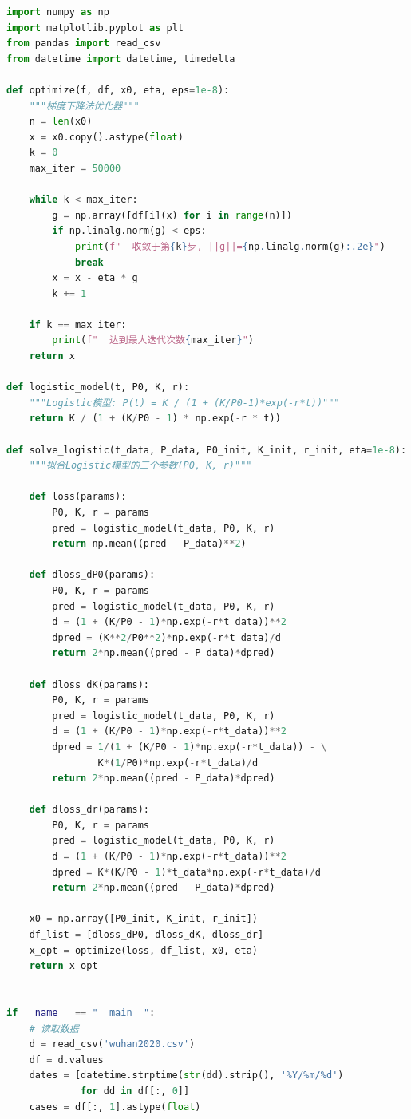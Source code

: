 \documentclass{article}
\begin{document}
\begin{lstlisting}[language=Python, caption={nonlinfitEx3.py —— COVID-19 Logistic模型}]
import numpy as np
import matplotlib.pyplot as plt
from pandas import read_csv
from datetime import datetime, timedelta

def optimize(f, df, x0, eta, eps=1e-8):
    """梯度下降法优化器"""
    n = len(x0)
    x = x0.copy().astype(float)
    k = 0
    max_iter = 50000
    
    while k < max_iter:
        g = np.array([df[i](x) for i in range(n)])
        if np.linalg.norm(g) < eps:
            print(f"  收敛于第{k}步, ||g||={np.linalg.norm(g):.2e}")
            break
        x = x - eta * g
        k += 1
    
    if k == max_iter:
        print(f"  达到最大迭代次数{max_iter}")
    return x

def logistic_model(t, P0, K, r):
    """Logistic模型: P(t) = K / (1 + (K/P0-1)*exp(-r*t))"""
    return K / (1 + (K/P0 - 1) * np.exp(-r * t))

def solve_logistic(t_data, P_data, P0_init, K_init, r_init, eta=1e-8):
    """拟合Logistic模型的三个参数(P0, K, r)"""
    
    def loss(params):
        P0, K, r = params
        pred = logistic_model(t_data, P0, K, r)
        return np.mean((pred - P_data)**2)
    
    def dloss_dP0(params):
        P0, K, r = params
        pred = logistic_model(t_data, P0, K, r)
        d = (1 + (K/P0 - 1)*np.exp(-r*t_data))**2
        dpred = (K**2/P0**2)*np.exp(-r*t_data)/d
        return 2*np.mean((pred - P_data)*dpred)
    
    def dloss_dK(params):
        P0, K, r = params
        pred = logistic_model(t_data, P0, K, r)
        d = (1 + (K/P0 - 1)*np.exp(-r*t_data))**2
        dpred = 1/(1 + (K/P0 - 1)*np.exp(-r*t_data)) - \
                K*(1/P0)*np.exp(-r*t_data)/d
        return 2*np.mean((pred - P_data)*dpred)
    
    def dloss_dr(params):
        P0, K, r = params
        pred = logistic_model(t_data, P0, K, r)
        d = (1 + (K/P0 - 1)*np.exp(-r*t_data))**2
        dpred = K*(K/P0 - 1)*t_data*np.exp(-r*t_data)/d
        return 2*np.mean((pred - P_data)*dpred)
    
    x0 = np.array([P0_init, K_init, r_init])
    df_list = [dloss_dP0, dloss_dK, dloss_dr]
    x_opt = optimize(loss, df_list, x0, eta)
    return x_opt


if __name__ == "__main__":
    # 读取数据
    d = read_csv('wuhan2020.csv')
    df = d.values
    dates = [datetime.strptime(str(dd).strip(), '%Y/%m/%d') 
             for dd in df[:, 0]]
    cases = df[:, 1].astype(float)
    

\end{lstlisting}
\end{document}
